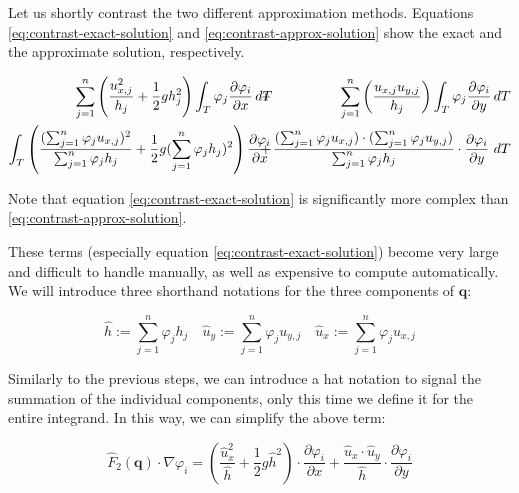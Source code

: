 \documentclass[a4paper, twoside]{article}
\newcommand{\pd}[2]{\dfrac{\partial #1}{\partial #2}}
\renewcommand{\phi}{\varphi}
\begin{document}
Let us shortly contrast the two different approximation methods. Equations \eqref{eq:contrast-exact-solution} and \eqref{eq:contrast-approx-solution} show the exact and the approximate solution, respectively.

\begin{eqnarray}
  \label{eq:contrast-approx-solution}
  \sum_{j=1}^n \left(\frac{u_{x,j}^2}{h_j}  + \frac{1}{2} g h_j^2\right) \int_T \phi_j \pd{\phi_i}{x} \, dT
  \hspace{-.3cm} & + & \hspace{-.3cm} \sum_{j=1}^n \left(\frac{u_{x,j} u_{y,j}}{h_j}\right) \int_T \phi_j \pd{\phi_i}{y} \, dT \\
  \label{eq:contrast-exact-solution}
  \int_T \left( \frac{(\sum_{j=1}^n \phi_j u_{x,j})^2}{\sum_{j=1}^n \phi_j h_j} + \frac{1}{2} g (\sum_{j=1}^n \phi_j h_j)^2 \right) \pd{\phi_i}{x}
  \hspace{-.3cm} & + & \hspace{-.3cm} \frac{(\sum_{j=1}^n \phi_j u_{x,j}) \cdot (\sum_{j=1}^n \phi_j u_{y,j})}{\sum_{j=1}^n \phi_j h_j} \cdot \pd{\phi_i}{y}\ dT
\end{eqnarray}

Note that equation \eqref{eq:contrast-exact-solution} is significantly more complex than \eqref{eq:contrast-approx-solution}.

These terms (especially equation \eqref{eq:contrast-exact-solution}) become very large and difficult to handle manually, as well as expensive to compute automatically. We will introduce three shorthand notations for the three components of $\mathbf{q}$:

\begin{equation}
  \label{eq:substitutions-for-all-components-with-hat}
  \widehat{h} := \sum_{j=1}^n \phi_j h_j \quad
  \widehat{u}_y := \sum_{j=1}^n \phi_j u_{y,j} \quad
  \widehat{u}_x := \sum_{j=1}^n \phi_j u_{x,j}
\end{equation}

Similarly to the previous steps, we can introduce a hat notation to signal the summation of the individual components, only this time we define it for the entire integrand. In this way, we can simplify the above term:

\begin{equation}
  \label{eq:stiffness-analysis-second-line-exact-approx-simple}
  \widehat{F}_2(\mathbf{q}) \cdot \nabla \phi_i =
  \left( \frac{\widehat{u}_x^2}{\widehat{h}} + \frac{1}{2} g \widehat{h}^2 \right) \cdot \pd{\phi_i}{x} +
  \frac{\widehat{u}_x \cdot \widehat{u}_y }{\widehat{h}} \cdot \pd{\phi_i}{y}
\end{equation}
\end{document}
